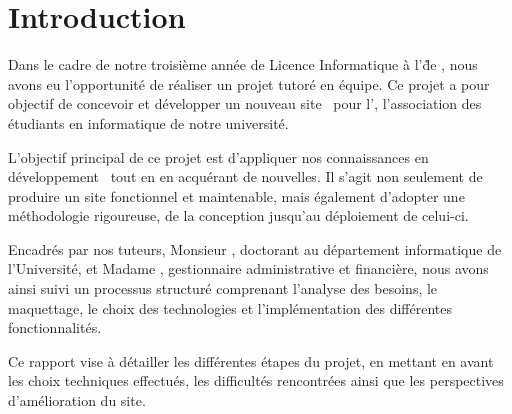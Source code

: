\chapter{Introduction}
\label{chap:intro}

Dans le cadre de notre troisième année de Licence Informatique à l’\univ\~ de , nous avons eu l’opportunité de réaliser un projet tutoré en équipe. Ce projet a pour objectif de concevoir et développer un nouveau site \web\ pour l’\ofni, l’association des étudiants en informatique de notre université.
\bigskip

L’objectif principal de ce projet est d’appliquer nos connaissances en développement \web\ tout en en acquérant de nouvelles. Il s’agit non seulement de produire un site fonctionnel et maintenable, mais également d’adopter une méthodologie rigoureuse, de la conception jusqu’au déploiement de celui-ci.
\bigskip

Encadrés par nos tuteurs, Monsieur , doctorant au département informatique de l'Université, et Madame , gestionnaire administrative et financière, nous avons ainsi suivi un processus structuré comprenant l’analyse des besoins, le maquettage, le choix des technologies et l’implémentation des différentes fonctionnalités.
\bigskip

Ce rapport vise à détailler les différentes étapes du projet, en mettant en avant les choix techniques effectués, les difficultés rencontrées ainsi que les perspectives d’amélioration du site.
